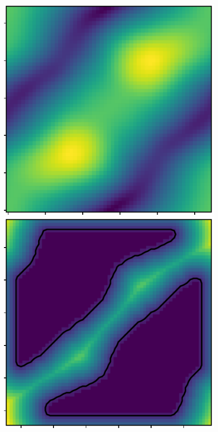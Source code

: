 \begin{figure}[htbp]
\centering
    \includegraphics[scale=1.]{figures/hsn_field.pdf}
    \includegraphics[scale=1.]{figures/hsn_boundary.pdf}
    \caption{}
    \label{fig:hsn}
\end{figure}

